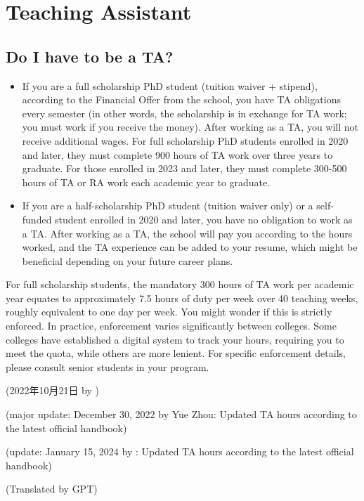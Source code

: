 \section{Teaching Assistant}

\subsection{Do I have to be a TA?}
\begin{itemize}
    \item If you are a full scholarship PhD student (tuition waiver + stipend), according to the Financial Offer from the school, you have TA obligations every semester (in other words, the scholarship is in exchange for TA work; you must work if you receive the money). After working as a TA, you will not receive additional wages. For full scholarship PhD students enrolled in 2020 and later, they must complete 900 hours of TA work over three years to graduate. For those enrolled in 2023 and later, they must complete 300-500 hours of TA or RA work each academic year to graduate.
    \item If you are a half-scholarship PhD student (tuition waiver only) or a self-funded student enrolled in 2020 and later, you have no obligation to work as a TA. After working as a TA, the school will pay you according to the hours worked, and the TA experience can be added to your resume, which might be beneficial depending on your future career plans.
\end{itemize}

For full scholarship students, the mandatory 300 hours of TA work per academic year equates to approximately 7.5 hours of duty per week over 40 teaching weeks, roughly equivalent to one day per week. You might wonder if this is strictly enforced. In practice, enforcement varies significantly between colleges. Some colleges have established a digital system to track your hours, requiring you to meet the quota, while others are more lenient. For specific enforcement details, please consult senior students in your program.

\begin{flushright}
    (2022年10月21日 by \Wu)

    (major update: December 30, 2022 by Yue Zhou: Updated TA hours according to the latest official handbook)

    (update: January 15, 2024 by \Wu : Updated TA hours according to the latest official handbook)

    (Translated by GPT)
\end{flushright}

